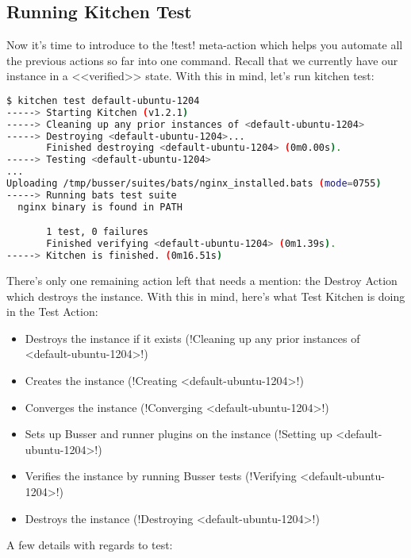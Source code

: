 \subsection{Running Kitchen Test}

Now it's time to introduce to the \inline!test! meta-action which helps you automate all the previous actions so far into one command. Recall that we currently have our instance in a <<verified>> state. With this in mind, let's run kitchen test:

\begin{lstlisting}[language=Bash,label=lst:testing-test-kitchen18]
$ kitchen test default-ubuntu-1204
-----> Starting Kitchen (v1.2.1)
-----> Cleaning up any prior instances of <default-ubuntu-1204>
-----> Destroying <default-ubuntu-1204>...
       Finished destroying <default-ubuntu-1204> (0m0.00s).
-----> Testing <default-ubuntu-1204>
...
Uploading /tmp/busser/suites/bats/nginx_installed.bats (mode=0755)
-----> Running bats test suite
  nginx binary is found in PATH

       1 test, 0 failures
       Finished verifying <default-ubuntu-1204> (0m1.39s).
-----> Kitchen is finished. (0m16.51s)
\end{lstlisting}

There's only one remaining action left that needs a mention: the Destroy Action which destroys the instance. With this in mind, here's what Test Kitchen is doing in the Test Action:

\begin{itemize}
  \item Destroys the instance if it exists (\inline!Cleaning up any prior instances of <default-ubuntu-1204>!)
  \item Creates the instance (\inline!Creating <default-ubuntu-1204>!)
  \item Converges the instance (\inline!Converging <default-ubuntu-1204>!)
  \item Sets up Busser and runner plugins on the instance (\inline!Setting up <default-ubuntu-1204>!)
  \item Verifies the instance by running Busser tests (\inline!Verifying <default-ubuntu-1204>!)
  \item Destroys the instance (\inline!Destroying <default-ubuntu-1204>!)
\end{itemize}

A few details with regards to test:

